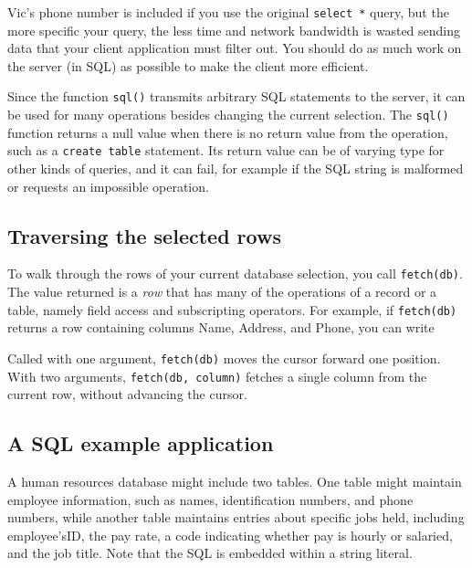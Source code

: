 
Vic's phone number is included if you use the original
\texttt{select *} query, but the more specific your query, the less
time and network bandwidth is wasted sending data that your client
application must filter out. You should do as much work on the server
(in SQL) as possible to make the client more efficient.

Since the function \texttt{sql()} transmits arbitrary SQL statements to
the server, it can be used for many operations besides changing the
current selection. The \texttt{sql()} function returns a null value
when there is no return value from the operation, such as a
\texttt{create table} statement. Its return value can be of varying
type for other kinds of queries, and it can fail, for example if the
SQL string is malformed or requests an impossible operation.

\subsection{Traversing the selected rows}

To walk through the rows of your current database selection, you call
\texttt{fetch(db)}. The value returned is a
\textit{row} that has many of the operations of a record or a table,
namely field access and subscripting operators. For example, if
\texttt{fetch(db)} returns a row containing columns Name, Address, and
Phone, you can write


Called with one argument, \texttt{fetch(db)} moves the cursor forward
one position. With two arguments, \texttt{fetch(db, column)} fetches a
single column from the current row, without advancing the cursor.

\subsection{A SQL example application}

A human resources database might include two tables. One
table might maintain employee information, such as names,
identification numbers, and phone numbers, while another table
maintains entries about specific jobs held, including
employee'sID, the pay rate, a code indicating whether
pay is hourly or salaried, and the job title. Note that the SQL is
embedded within a string literal.

